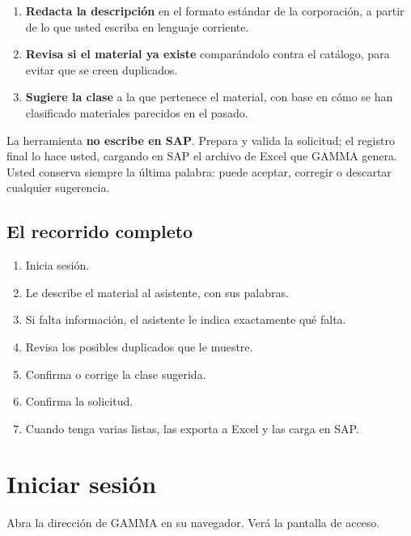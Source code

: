 \begin{enumerate}[leftmargin=*, itemsep=3pt]
  \item \textbf{Redacta la descripción} en el formato estándar de la
        corporación, a partir de lo que usted escriba en lenguaje corriente.
  \item \textbf{Revisa si el material ya existe} comparándolo contra el
        catálogo, para evitar que se creen duplicados.
  \item \textbf{Sugiere la clase} a la que pertenece el material, con base en
        cómo se han clasificado materiales parecidos en el pasado.
\end{enumerate}

\begin{aviso}
La herramienta \textbf{no escribe en SAP}. Prepara y valida la solicitud; el
registro final lo hace usted, cargando en SAP el archivo de Excel que GAMMA
genera. Usted conserva siempre la última palabra: puede aceptar, corregir o
descartar cualquier sugerencia.
\end{aviso}

\subsection{El recorrido completo}

\begin{enumerate}[leftmargin=*, itemsep=3pt]
  \item Inicia sesión.
  \item Le describe el material al asistente, con sus palabras.
  \item Si falta información, el asistente le indica exactamente qué falta.
  \item Revisa los posibles duplicados que le muestre.
  \item Confirma o corrige la clase sugerida.
  \item Confirma la solicitud.
  \item Cuando tenga varias listas, las exporta a Excel y las carga en SAP.
\end{enumerate}

\newpage
\section{Iniciar sesión}

Abra la dirección de GAMMA en su navegador. Verá la pantalla de acceso.


